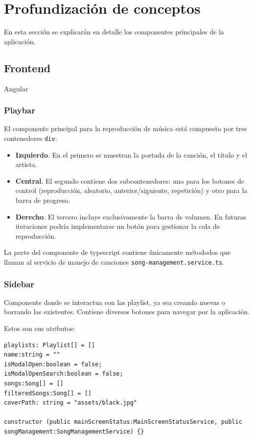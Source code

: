 \documentclass[11pt, a4paper]{article}
\begin{document}
\section{Profundización de conceptos}

En esta sección se explicarán en detalle los componentes principales de la aplicación.

        \subsection{Frontend}

        Angular

            \subsubsection{Playbar}

            El componente principal para la reproducción de música está compuesto por tres contenedores \verb|div|:

            \begin{itemize}
                \item \textbf{Izquierdo}. En el primero se muestran la portada de la canción, el título y el artista.
                \item \textbf{Central}. El segundo contiene dos subcontenedores: uno para los botones de control (reproducción, aleatorio, anterior/siguiente, repetición) y otro para la barra de progreso.
                \item \textbf{Derecho}. El tercero incluye exclusivamente la barra de volumen. En futuras iteraciones podría implementarse un botón para gestionar la cola de reproducción.
            \end{itemize}

            La parte del componente de typescript contiene únicamente métododos que llaman al servicio de manejo de canciones \verb|song-management.service.ts|.

            \subsubsection{Sidebar}

            Componente donde se interactua con las playlist, ya sea creando nuevas o borrando las existentes. Contiene diversos botones para navegar por la aplicación.

            Estos son sus atributos:

            \begin{lstlisting}[caption={Atributos Y Constructora Sidebar}]
playlists: Playlist[] = []
name:string = ""
isModalOpen:boolean = false;
isModalOpenSearch:boolean = false;
songs:Song[] = []
filteredSongs:Song[] = []
coverPath: string = "assets/black.jpg"

constructor (public mainScreenStatus:MainScreenStatusService, public songManagement:SongManagementService) {}
            \end{lstlisting}
\end{document}
